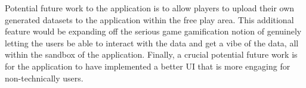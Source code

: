 		Potential future work to the application is to allow players to upload their own generated datasets to the application within the free play area. This additional feature would be expanding off the serious game gamification notion of genuinely letting the users be able to interact with the data and get a vibe of the data, all within the sandbox of the application. Finally, a crucial potential future work is for the application to have implemented a better UI that is more engaging for non-technically users.  




	
	
	
	
	
		
	


